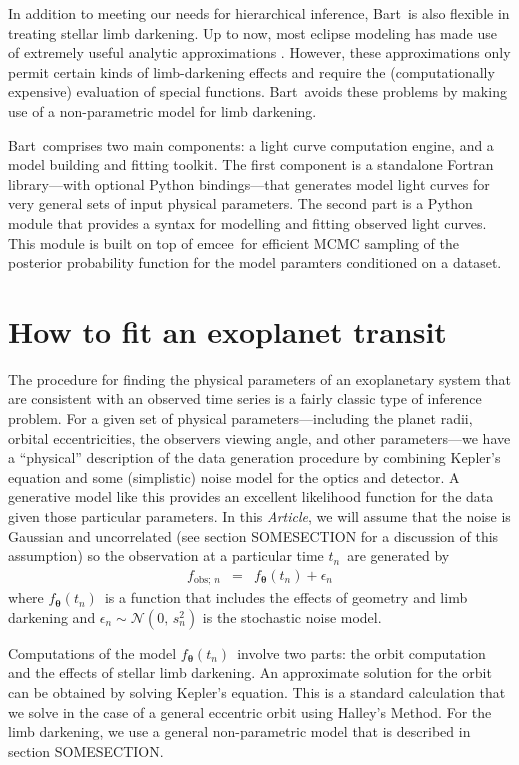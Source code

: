 \documentclass[12pt,preprint]{aastex}
\newcommand{\project}[1]{{\sffamily #1}}
\newcommand{\bart}{\project{Bart}}
\newcommand{\emcee}{\project{emcee}}
\newcommand{\paper}{\emph{Article}}
\newcommand{\bvec}[1]{\ensuremath{\boldsymbol{#1}}}
\newcommand{\normal}[1]{\ensuremath{\mathcal{N}(#1)}}
\newcommand{\model}{\ensuremath{\bvec{\theta}}}
\newcommand{\tobs}{\ensuremath{t_n}}
\newcommand{\fmodel}{\ensuremath{f_{\model} (\tobs)}}
\newcommand{\fobs}{\ensuremath{f_{\mathrm{obs};\,n}}}
\newcommand{\fullerr}{\ensuremath{s_n^2}}
\begin{document}
In addition to meeting our needs for hierarchical inference, \bart\ is
also flexible in treating stellar limb darkening.
Up to now, most eclipse modeling has made use of extremely useful analytic
approximations \citep{mandel}.
However, these approximations only permit certain kinds of limb-darkening
effects and require the (computationally expensive) evaluation of special
functions.
\bart\ avoids these problems by making use of a non-parametric model for limb
darkening.

\bart\ comprises two main components: a light curve computation engine, and a
model building and fitting  toolkit.
The first component is a standalone Fortran library---with optional Python
bindings---that generates model light curves for very general sets of input
physical parameters.
The second part is a Python module that provides a syntax for modelling and
fitting observed light curves.
This module is built on top of \emcee\ for efficient MCMC sampling of the
posterior probability function for the model paramters conditioned on a
dataset.


\section{How to fit an exoplanet transit}

The procedure for finding the physical parameters of an exoplanetary system
that are consistent with an observed time series is a fairly classic type of
inference problem.
For a given set of physical parameters---including the
planet radii, orbital eccentricities, the observers viewing angle, and other
parameters---we have a ``physical'' description of the data generation
procedure by combining Kepler's equation and some (simplistic) noise model for
the optics and detector.
A generative model like this provides an excellent
likelihood function for the data given those particular parameters.
In this \paper, we will assume that the noise is Gaussian and uncorrelated
(see section SOMESECTION for a discussion of this assumption) so the
observation at a particular time \tobs\ are generated by
\begin{eqnarray}
    \fobs & = & \fmodel + \epsilon_n
\end{eqnarray}
where \fmodel\ is a function that includes the effects of geometry
and limb darkening and $\epsilon_n \sim \normal{0,\,\fullerr}$ is the
stochastic noise model.

Computations of the model \fmodel\ involve two parts: the
orbit computation and the effects of stellar limb darkening.
An approximate solution for the orbit can be obtained by solving Kepler's
equation.
This is a standard calculation that we solve in the case of a general
eccentric orbit using Halley's Method.
For the limb darkening, we use a general non-parametric model that is
described in section SOMESECTION.
\end{document}
